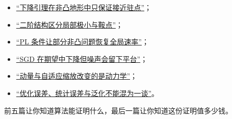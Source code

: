 \begin{itemize}
\tightlist
\item \hyperref[sec:09-Convex-Optimization/08-Nonconvex-and-Stochastic-Optimization/01]{``下降引理在非凸地形中只保证接近驻点''}；
\item \hyperref[sec:09-Convex-Optimization/08-Nonconvex-and-Stochastic-Optimization/02]{``二阶结构区分局部极小与鞍点''}；
\item \hyperref[sec:09-Convex-Optimization/08-Nonconvex-and-Stochastic-Optimization/03]{``PL 条件让部分非凸问题恢复全局速率''}；
\item \hyperref[sec:09-Convex-Optimization/08-Nonconvex-and-Stochastic-Optimization/04]{``SGD 在期望中下降但噪声会留下平台''}；
\item \hyperref[sec:09-Convex-Optimization/08-Nonconvex-and-Stochastic-Optimization/05]{``动量与自适应缩放改变的是动力学''}；
\item \hyperref[sec:09-Convex-Optimization/08-Nonconvex-and-Stochastic-Optimization/06]{``优化误差、统计误差与泛化不能混为一谈''}。
\end{itemize}

前五篇让你知道算法能证明什么，最后一篇让你知道这份证明值多少钱。

